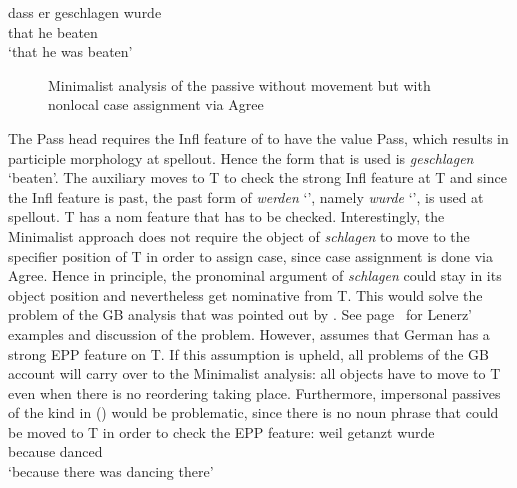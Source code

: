 \ea
\gll dass er geschlagen wurde\\
     that he beaten \AUX\\
\glt `that he was beaten'
\z
\begin{figure}
\caption{\label{fig-passive-schlagen-mp}Minimalist analysis of the passive without movement but with
nonlocal case assignment via Agree}
\end{figure}%
The Pass head requires the Infl feature of \littlev to have the value Pass, which results in participle morphology at
spellout. Hence the form that is used is \emph{geschlagen} `beaten'. The auxiliary moves to T to check the
strong Infl feature at T and since the Infl feature is past, the past form of \emph{werden} `\AUX', namely
\emph{wurde} `\AUX', is used at spellout. T has a nom feature that has to be checked. Interestingly, the
Minimalist approach does not require the object of \emph{schlagen} to move to the specifier position
of T in order to assign case, since case assignment is done via Agree. Hence in principle, the pronominal argument
of \emph{schlagen} could stay in its object position and nevertheless get nominative
from T. This would solve the problem of the GB analysis that was pointed out by \citet[Section~4.4.3]{Lenerz77}. See
page~\pageref{ex-passive-German-no-movement} for Lenerz' examples and discussion of the
problem.
However, \citet[]{Adger2003a} assumes that German has a strong EPP feature on T. If this
assumption is upheld, all problems of the GB account will carry over to the Minimalist analysis: all
objects have to move to T even when there is no reordering taking place. Furthermore, impersonal
passives of the kind in () would be problematic, since there is no noun phrase that could be
moved to T in order to check the EPP feature:
\ea
\gll weil getanzt wurde\\
     because danced \AUX\\
\glt `because there was dancing there'
\z
{}

